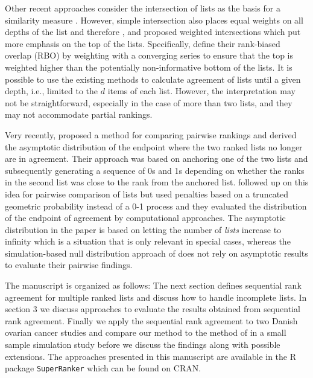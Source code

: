 \documentclass[oupdraft]{bio}
\newcommand{\added}[1]{{\color{added}{}#1}}
\begin{document}
Other recent approaches consider the intersection of lists as the
basis for a similarity measure \citep{iriz:etal:2005}. However, simple
intersection also places equal weights on all depths of the list and
therefore \citet{Fagin2003}, and \citet{Webber2010} proposed weighted
intersections which put more emphasis on the top of the lists.
Specifically, \citet{Webber2010} define their rank-biased overlap
(RBO) by weighting with a converging series to ensure that the top is
weighted higher than the potentially non-informative bottom of the
lists.  It is possible to use the existing methods to calculate
agreement of lists until a given depth, i.e., limited to the $d$ items
of each list. However, the interpretation may not be straightforward,
especially in the case of more than two lists, and they may not
accommodate partial rankings.


Very recently, \citet{hall:schi:2012} proposed a method for comparing
pairwise rankings and derived the asymptotic distribution of the
endpoint where the two ranked lists no longer are in agreement. Their
approach was based on anchoring one of the two lists and subsequently
generating a sequence of 0s and 1s depending on whether the ranks in
the second list was close to the rank from the anchored
list. \citet{samp:verd:2013} followed up on this idea for pairwise
comparison of lists but used penalties based on a truncated geometric
probability instead of a 0-1 process and they evaluated the
distribution of the endpoint of agreement by computational approaches.
The asymptotic distribution in the \citet{hall:schi:2012} paper is
based on letting the number of \emph{lists} increase to infinity which
is a situation that is only relevant in special cases, whereas the
\added{simulation-based null distribution approach of
  \citet{samp:verd:2013} does not rely on asymptotic results to
  evaluate their pairwise findings.}



The manuscript is organized as follows: The next section defines
sequential rank agreement for multiple ranked lists and discuss how to
handle incomplete lists. In section 3 we discuss approaches to
evaluate the results obtained from sequential rank agreement. Finally
we apply the sequential rank agreement to two Danish ovarian cancer
studies and compare our method to the method of \citet{hall:schi:2012}
in a small sample simulation study before we discuss the findings
along with possible extensions. The approaches presented in this
manuscript are available in the R package \texttt{SuperRanker} which
can be found on CRAN.
\end{document}
